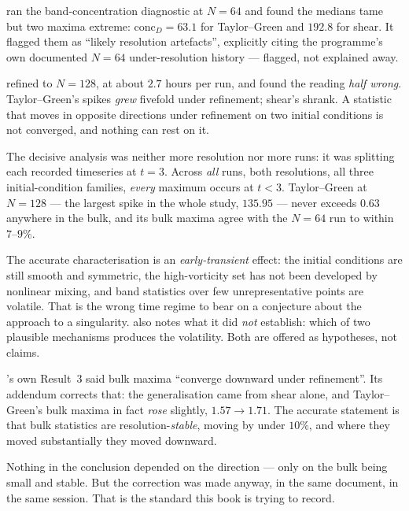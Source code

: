  ran the band-concentration diagnostic at \(N=64\) and found the
medians tame but two maxima extreme: \(\mathrm{conc}_D=63.1\) for
Taylor--Green and \(192.8\) for shear. It flagged them as ``likely resolution
artefacts'', explicitly citing the programme's own documented \(N=64\)
under-resolution history --- flagged, not explained away.

 refined to \(N=128\), at about \(2.7\) hours per run, and found the
reading \emph{half wrong}. Taylor--Green's spikes \emph{grew} fivefold under
refinement; shear's shrank. A statistic that moves in opposite directions under
refinement on two initial conditions is not converged, and nothing can rest on
it.

The decisive analysis was neither more resolution nor more runs: it was
splitting each recorded timeseries at \(t=3\). Across \emph{all} runs, both
resolutions, all three initial-condition families, \emph{every} maximum occurs
at \(t<3\). Taylor--Green at \(N=128\) --- the largest spike in the whole
study, \(135.95\) --- never exceeds \(0.63\) anywhere in the bulk, and its bulk
maxima agree with the \(N=64\) run to within \(7\)--\(9\%\).

The accurate characterisation is an \emph{early-transient} effect: the initial
conditions are still smooth and symmetric, the high-vorticity set has not been
developed by nonlinear mixing, and band statistics over few unrepresentative
points are volatile. That is the wrong time regime to bear on a conjecture
about the approach to a singularity.  also notes what it did
\emph{not} establish: which of two plausible mechanisms produces the
volatility. Both are offered as hypotheses, not claims.

\begin{obsv}
\label{obs:s43-self-correction}
's own Result~3 said bulk maxima ``converge downward under
refinement''. Its addendum corrects that: the generalisation came from shear
alone, and Taylor--Green's bulk maxima in fact \emph{rose} slightly,
\(1.57\to1.71\). The accurate statement is that bulk statistics are
resolution-\emph{stable}, moving by under \(10\%\), and where they moved
substantially they moved downward.

\smallskip
Nothing in the conclusion depended on the direction --- only on the bulk being
small and stable. But the correction was made anyway, in the same document, in
the same session. That is the standard this book is trying to record.
\end{obsv}

